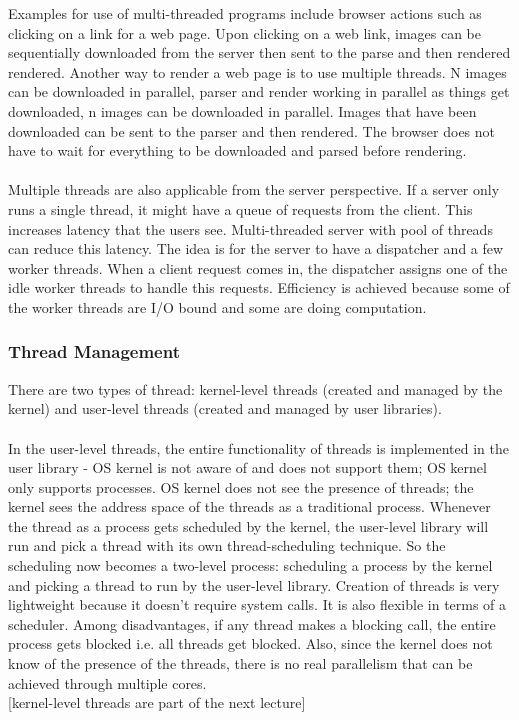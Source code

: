 \documentclass[twoside]{article}
\begin{document}
Examples for use of multi-threaded programs include browser actions such as clicking on a link for a web page. Upon clicking on a web link, images can be sequentially downloaded from the server then sent to the parse and then rendered rendered. Another way to render a web page is to use multiple threads. N images can be downloaded in parallel, parser and render working in parallel as things get downloaded, n images can be downloaded in parallel. Images that have been downloaded can be sent to the parser and then rendered. The browser does not have to wait for everything to be downloaded and parsed before rendering. \\ \\
Multiple threads are also applicable from the server perspective. If a server only runs a single thread, it might have a queue of requests from the client. This increases latency that the users see. Multi-threaded server with pool of threads can reduce this latency. The idea is for the server to have a dispatcher and a few worker threads. When a client request comes in, the dispatcher assigns one of the idle worker threads to handle this requests. Efficiency is achieved because some of the worker threads are I/O bound and some are doing computation.\\

\subsubsection{Thread Management}
There are two types of thread: kernel-level threads (created and managed by the kernel) and user-level threads (created and managed by user libraries). \\ \\ 
In the user-level threads, the entire functionality of threads is implemented in the user library - OS kernel is not aware of and does not support them; OS kernel only supports processes. OS kernel does not see the presence of threads; the kernel sees the address space of the threads as a traditional process. Whenever the thread as a process gets scheduled by the kernel, the user-level library will run and pick a thread with its own thread-scheduling technique. So the scheduling now becomes a two-level process: scheduling a process by the kernel and picking a thread to run by the user-level library. Creation of threads is very lightweight because it doesn't require system calls. It is also flexible in terms of a scheduler. Among disadvantages, if any thread makes a blocking call, the entire process gets blocked i.e. all threads get blocked. Also, since the kernel does not know of the presence of the threads, there is no real parallelism that can be achieved through multiple cores. \\
{[kernel-level threads are part of the next lecture]}
\end{document}
